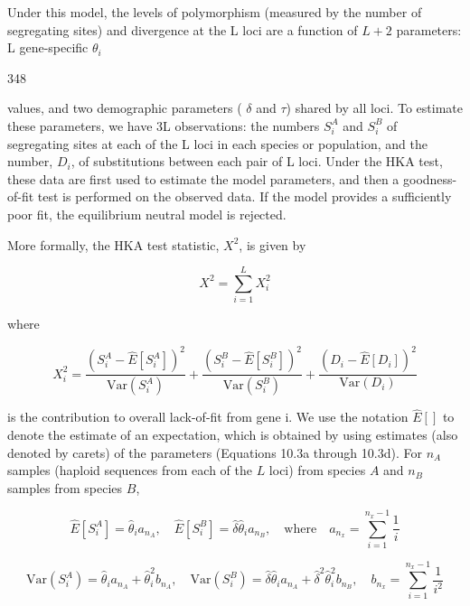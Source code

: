 \documentclass{article}
\begin{document}
Under this model, the levels of polymorphism (measured by the number of segregating sites) and divergence at the L loci are a function of  $ L + 2 $ parameters: L gene-specific  $ \theta_{i} $

348

values, and two demographic parameters ( $ \delta $ and  $ \tau $) shared by all loci. To estimate these parameters, we have 3L observations: the numbers  $ S_i^A $ and  $ S_i^B $ of segregating sites at each of the L loci in each species or population, and the number,  $ D_i $, of substitutions between each pair of L loci. Under the HKA test, these data are first used to estimate the model parameters, and then a goodness-of-fit test is performed on the observed data. If the model provides a sufficiently poor fit, the equilibrium neutral model is rejected.

More formally, the HKA test statistic,  $ X^{2} $, is given by

\begin{equation}
X^{2}=\sum_{i=1}^{L}X_{i}^{2}
\tag{10.2a}
\label{eq:10_2a}
\end{equation}

where

\begin{equation}
X_{i}^{2}=\frac{\left(S_{i}^{A}-\widehat{E}[S_{i}^{A}]\right)^{2}}{\mathrm{Var}(S_{i}^{A})}+\frac{\left(S_{i}^{B}-\widehat{E}[S_{i}^{B}]\right)^{2}}{\mathrm{Var}(S_{i}^{B})}+\frac{\left(D_{i}-\widehat{E}[D_{i}]\right)^{2}}{\mathrm{Var}(D_{i})}
\tag{10.2b}
\label{eq:10_2b}
\end{equation}

is the contribution to overall lack-of-fit from gene i. We use the notation  $ \widehat{E}[] $ to denote the estimate of an expectation, which is obtained by using estimates (also denoted by carets) of the parameters (Equations 10.3a through 10.3d). For  $ n_A $ samples (haploid sequences from each of the  $ L $ loci) from species  $ A $ and  $ n_B $ samples from species  $ B $,

\begin{equation}
\widehat{E}[S_{i}^{A}]=\widehat{\theta}_{i}a_{n_{A}},\quad\widehat{E}[S_{i}^{B}]=\widehat{\delta}\widehat{\theta}_{i}a_{n_{B}},\quad\mathrm{w h e r e}\quad a_{n_{x}}=\sum_{i=1}^{n_{x}-1}\frac{1}{i}
\tag{10.3a}
\label{eq:10_3a}
\end{equation}

\begin{equation}
\mathrm{V a r}(S_{i}^{A})=\widehat{\theta}_{i}a_{n_{A}}+\widehat{\theta}_{i}^{2}b_{n_{A}},\quad\mathrm{V a r}(S_{i}^{B})=\widehat{\delta}\widehat{\theta}_{i}a_{n_{A}}+\widehat{\delta}^{2}\widehat{\theta}_{i}^{2}b_{n_{B}},\quad b_{n_{x}}=\sum_{i=1}^{n_{x}-1}\frac{1}{i^{2}}
\tag{10.3b}
\label{eq:10_3b}
\end{equation}
\end{document}
